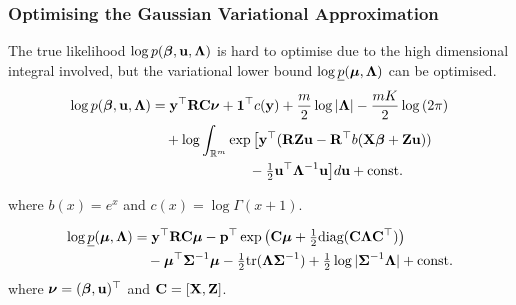 \documentclass{beamer}
\begin{document}
\begin{frame}
	\frametitle{Optimising the Gaussian Variational Approximation}
	The true likelihood $\log p({\boldsymbol \beta}, {\bf u}, {\boldsymbol \Lambda})$ is hard to optimise due 
	to the high dimensional integral involved, but the variational lower bound $\log \underline{p}({\boldsymbol \mu}, {\boldsymbol \Lambda})$ can be optimised.
	\begin{align*}
		\log p({\boldsymbol \beta}, {\bf u}, {\boldsymbol \Lambda})      & = {\bf y}^\top {\bf R} {\bf C} {\boldsymbol\nu} + {\bf 1}^\top c({\bf y}) + \frac{m}{2} \log |{\boldsymbol \Lambda}| - \frac{mK}{2} \log{(2 \pi)}                           \\
		                                   & \quad + \log  \int_{\mathbb{R}^{m}} \exp \big[ {\bf y}^\top ({\bf R} {\bf Z} {\bf u} - {\bf R}^\top b( {\bf X} {\boldsymbol \beta} + {\bf Z} {\bf u}))                        \\
		                                   & \quad \quad \quad \quad \quad \quad \quad - \tfrac{1}{2} {{\bf u}^\top {\boldsymbol\Lambda}^{-1} {\bf u} } \big] d {\bf u} + \text{const.}                   \\
    \end{align*}

    where $b(x) = e^x$ and $c(x) = \log \Gamma(x + 1)$.

    \begin{align*}		                                   
		\log \underline{p}({\boldsymbol \mu}, {\boldsymbol \Lambda}) & = {\bf y}^\top {\bf R} {\bf C} {\boldsymbol\mu} - {\bf p}^\top \exp{\left({\bf C}{\boldsymbol\mu}+  \tfrac{1}{2} \text{diag}{({\bf C}{\boldsymbol\Lambda}{\bf C}^\top)}\right)}                               \\
		                                   & \quad - {\boldsymbol \mu}^\top {\boldsymbol\Sigma}^{-1} {\boldsymbol \mu} - \tfrac{1}{2} \text{tr}{({\boldsymbol\Lambda}{\boldsymbol\Sigma}^{-1})} + \tfrac{1}{2} \log{|{\boldsymbol\Sigma}^{-1}{\boldsymbol\Lambda}|} + \text{const.} \\
	\end{align*}
	where ${\boldsymbol \nu} = ({\boldsymbol \beta}, {\bf u})^\top$ and ${\bf C} = [{\bf X}, {\bf Z}]$.
\end{frame}

\def\checkmark{\tikz\fill[scale=0.4](0,.35) -- (.25,0) -- (1,.7) -- (.25,.15) -- cycle;}
\end{document}
